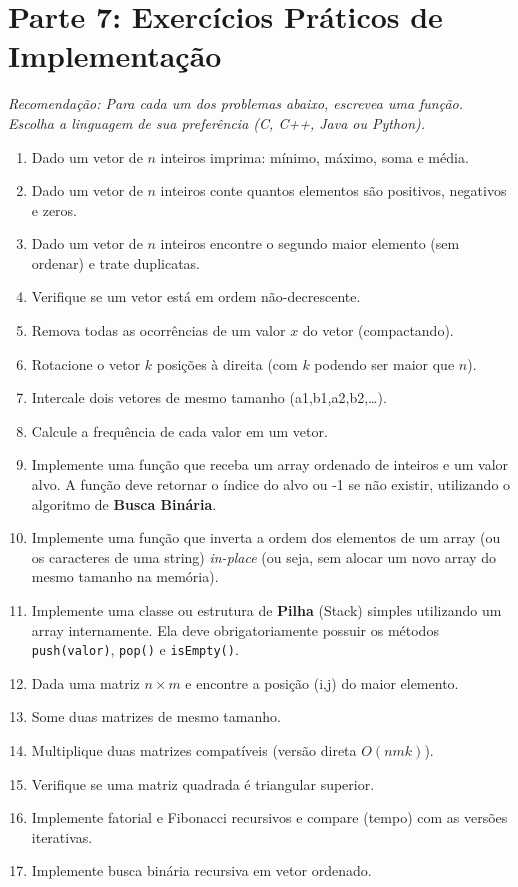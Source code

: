 \documentclass[10pt,a4paper]{article}
\begin{document}
\section*{Parte 7: Exercícios Práticos de Implementação}
\textit{Recomendação: Para cada um dos problemas abaixo, escrevea uma função. Escolha a linguagem de sua preferência (C, C++, Java ou Python).}
\begin{enumerate}[leftmargin=*, itemsep=2pt, resume]
    \item Dado um vetor de $n$ inteiros imprima: mínimo, máximo, soma e média.
    \item Dado um vetor de $n$ inteiros conte quantos elementos são positivos, negativos e zeros.
    \item Dado um vetor de $n$ inteiros encontre o segundo maior elemento (sem ordenar) e trate duplicatas.
    \item Verifique se um vetor está em ordem não-decrescente.
    \item Remova todas as ocorrências de um valor $x$ do vetor (compactando).
    \item Rotacione o vetor $k$ posições à direita (com $k$ podendo ser maior que $n$).
    \item Intercale dois vetores de mesmo tamanho (a1,b1,a2,b2,\dots).
    \item Calcule a frequência de cada valor em um vetor.\item Implemente uma função que receba um array ordenado de inteiros e um valor alvo. A função deve retornar o índice do alvo ou -1 se não existir, utilizando o algoritmo de \textbf{Busca Binária}.
    \item Implemente uma função que inverta a ordem dos elementos de um array (ou os caracteres de uma string) \textit{in-place} (ou seja, sem alocar um novo array do mesmo tamanho na memória).
    \item Implemente uma classe ou estrutura de \textbf{Pilha} (Stack) simples utilizando um array internamente. Ela deve obrigatoriamente possuir os métodos \texttt{push(valor)}, \texttt{pop()} e \texttt{isEmpty()}.
    \item Dada uma matriz $n\times m$ e encontre a posição (i,j) do maior elemento.
    \item Some duas matrizes de mesmo tamanho.
    \item Multiplique duas matrizes compatíveis (versão direta $O(nmk)$).
    \item Verifique se uma matriz quadrada é triangular superior.
    \item Implemente fatorial e Fibonacci recursivos e compare (tempo) com as versões iterativas.
    \item Implemente busca binária recursiva em vetor ordenado.
\end{enumerate}
\end{document}
